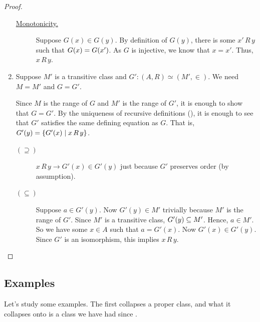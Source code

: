 \begin{proof}
\begin{enumerate}
\begin{description}
            \item[\underline{Monotonicity.}] Suppose $G(x) \in G(y)$. By definition of $G(y)$, there is some $x' \, R \, y$ such that $G(x) = G\of{x'}$. As $G$ is injective, we know that $x = x'$. Thus, $x \, R \, y$.
        \end{description}

        \item Suppose $M'$ is a transitive class and $G' : (A, R) \simeq (M', \in)$. We need $M = M'$ and $G = G'$.

        Since $M$ is the range of $G$ and $M'$ is the range of $G'$, it is enough to show that $G = G'$. By the uniqueness of recursive definitions (), it is enough to see that $G'$ satisfies the same defining equation as $G$. That is, $G'(y) = \left\{ G'\!\left( x \right) \; \middle\vert \; x \, R \, y \right\}$.

        \begin{description}
            \item[$(\supseteq)$]
                $x \, R \, y \to G'(x) \in G'(y)$ just because $G'$ preserves order (by assumption).

            \item[$(\subseteq)$]
                Suppose $a \in G'(y)$. Now $G'(y) \in M'$ trivially because $M'$ is the range of $G'$. Since $M'$ is a transitive class, $G'(y) \subseteq M'$. Hence, $a \in M'$. So we have some $x \in A$ such that $a = G'(x)$. Now $G'(x) \in G'(y)$. Since $G'$ is an isomorphism, this implies $x \, R \, y$.
        \end{description}
    \end{enumerate}
\end{proof}

\subsection{Examples}

Let's study some examples. The first collapses a proper class, and what it collapses onto is a class we have had since .

